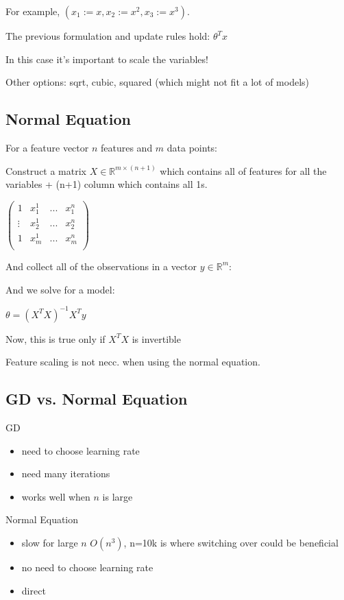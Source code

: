{{{For example, $(x_1 := x, x_2 := x^2, x_3 := x^3)$. 

The previous formulation and update rules hold: $\theta^Tx$

In this case it's important to scale the variables!

Other options: sqrt, cubic, squared (which might not fit a lot of models)

\subsection{Normal Equation}

For a feature vector $n$ features and $m$ data points: 

Construct a matrix $X  \in \mathbb{R}^{m\times (n+1)}$ which contains all of features for all the variables + (n+1) column which contains all 1s.

$\left( \begin{matrix} 1 & x_1^1 & ... & x_1^n \\ \vdots & x_2^1 & ... & x_2^n \\   1 & x_m^1 & ... & x_m^n \\ \end{matrix} \right)$

And collect all of the observations in a vector $y \in \mathbb{R}^m $:

And we solve for a model:

$\theta = (X^T X)^{-1} X^T y$



Now, this is true only if $X^T X$ is invertible

Feature scaling is not necc. when using the normal equation.

\subsection{GD vs. Normal Equation}

GD
\begin{itemize}
\item need to choose learning rate
\item need many iterations
\item works well when $n$ is large
\end{itemize}

Normal Equation 
\begin{itemize}
\item slow for large $n$  $O(n^3)$, n=10k is where switching over could be beneficial
\item no need to choose learning rate
\item direct
\end{itemize}

}}}
